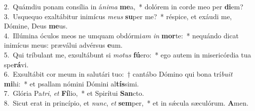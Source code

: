 {2.~}Quámdiu ponam consília in á\textit{ni}\textit{ma} \textbf{me}a,~* dolórem in corde meo per \textbf{di}em?\\
{3.~}Usquequo exaltábitur inimícus \textit{me}\textit{us} \textbf{su}per me?~* réspice, et exáudi me, Dómine, Deus \textbf{me}us.\\
{4.~}Illúmina óculos meos ne umquam obdórmi\textit{am} \textit{in} \textbf{mor}te:~* nequándo dicat inimícus meus: præválui advérsus \textbf{e}um.\\
{5.~}Qui tríbulant me, exsultábunt si \textit{mo}\textit{tus} \textbf{fú}ero:~* ego autem in misericórdia tua spe\textbf{rá}vi.\\
{6.~}Exsultábit cor meum in salutári tuo:~† cantábo Dómino qui bona trí\textit{bu}\textit{it} \textbf{mi}hi:~* et psallam nómini Dómini al\textbf{tís}simi.\\
{7.~}Glória Pa\textit{tri}, \textit{et} \textbf{Fí}lio,~* et Spirítui \textbf{San}cto.\\
{8.~}Sicut erat in princípio, et \textit{nunc}, \textit{et} \textbf{sem}per,~* et in sǽcula sæculórum. \textbf{A}men.\\
